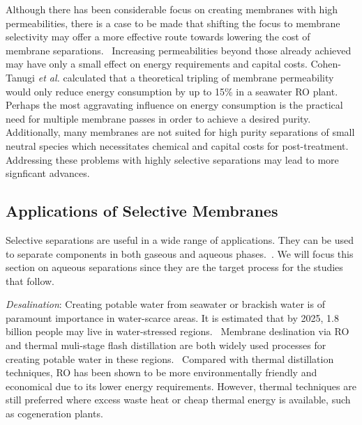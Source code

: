   Although there has been considerable focus on creating membranes with high
  permeabilities, there is a case to be made that shifting the focus to membrane
  selectivity may offer a more effective route towards lowering the cost of 
  membrane separations.~\cite{werber_materials_2016} Increasing permeabilities
  beyond those already achieved may have only a small effect on energy 
  requirements and capital costs. Cohen-Tanugi \textit{et al.} calculated that 
  a theoretical tripling of membrane permeability would only reduce energy 
  consumption by up to 15\% in a seawater RO plant.~\cite{cohen-tanugi_quantifying_2014}
  Perhaps the most aggravating influence on energy consumption is the practical
  need for multiple membrane passes in order to achieve a desired purity.~\cite{singh_production_2009}
  Additionally, many membranes are not suited for high purity separations
  of small neutral species which necessitates chemical and capital costs for
  post-treatment.~\cite{shannon_science_2009,fritzmann_state---art_2007}
  Addressing these problems with highly selective separations may lead to 
  more signficant advances.~\cite{deshmukh_desalination_2015}
  
  \subsection{Applications of Selective Membranes}
  
  Selective separations are useful in a wide range of applications. They can be used
  to separate components in both gaseous and aqueous phases.~\cite{baker_gas_2014}. We 
  will focus this section on aqueous separations since they are the target process
  for the studies that follow.
  
  \textit{Desalination}: Creating potable water from seawater or brackish water is of 
  paramount importance in water-scarce areas. It is estimated that by 2025, 1.8 
  billion people may live in water-stressed regions.~\cite{navarro-ortega_managing_2015} %
  Membrane deslination via RO and thermal muli-stage flash distillation are 
  both widely used processes for creating potable water in these regions.~\cite{fritzmann_state---art_2007}
  Compared with thermal distillation techniques, RO has been shown to 
  be more environmentally friendly and economical due to its lower energy
  requirements.\cite{morton_environmental_1997} However, thermal techniques are still
  preferred where excess waste heat or cheap thermal energy is available, such as
  cogeneration plants.\cite{bhojwani_technology_2019}

